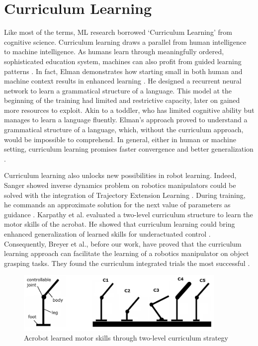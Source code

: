 \chapter{Curriculum Learning}

Like most of the terms, ML research borrowed ‘Curriculum Learning’ from cognitive science. Curriculum learning draws a parallel from human intelligence to machine intelligence. As humans learn through meaningfully ordered, sophisticated education system, machines can also profit from guided learning patterns \cite{Bengio2009}. In fact, Elman demonstrates how starting small in both human and machine context results in enhanced learning \cite{Elman1993}. He designed a recurrent neural network to learn a grammatical structure of a language. This model at the beginning of the training had limited and restrictive capacity, later on gained more resources to exploit. Akin to a toddler, who has limited cognitive ability but manages to learn a language fluently. Elman’s approach proved to understand a grammatical structure of a language, which, without the curriculum approach, would be impossible to comprehend. In general, either in human or machine setting, curriculum learning promises faster convergence and better generalization \cite{Bengio2009}. 

Curriculum learning also unlocks new possibilities in robot learning. Indeed, Sanger showed inverse dynamics problem on robotics manipulators could be solved with the integration of Trajectory Extension Learning \cite{Sanger1994}. During training, he commands an approximate solution for the next value of parameters as guidance \cite{Sanger1994}. Karpathy et al. evaluated a two-level curriculum structure to learn the motor skills of the acrobat. He showed that curriculum learning could bring enhanced generalization of learned skills for underactuated control \cite{Karpathy2012}. Consequently, Breyer et al., before our work, have proved that the curriculum learning approach can facilitate the learning of a robotics manipulator on object grasping tasks. They found the curriculum integrated trials the most successful \cite{Breyer2018}.

\begin{figure}[htbp]
    \centering
      \includegraphics[width=0.9\textwidth]{figures/acrobot}
    \caption{Acrobot learned motor skills through two-level curriculum strategy \cite{Karpathy2012}}
    \label{fig:curriculum}
\end{figure}

